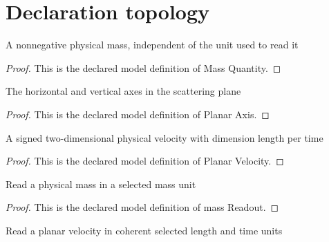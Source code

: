 \section{Declaration topology}
\begin{definition}
  \label{def:physics:phyx-mini-0497:phyxminiproblems-problemphyxmini0497-massquantity}
  A nonnegative physical mass, independent of the unit used to read it
\end{definition}
\begin{proof}
  This is the declared model definition of Mass Quantity.
\end{proof}
\begin{definition}
  \label{def:physics:phyx-mini-0497:phyxminiproblems-problemphyxmini0497-planaraxis}
  The horizontal and vertical axes in the scattering plane
\end{definition}
\begin{proof}
  This is the declared model definition of Planar Axis.
\end{proof}
\begin{definition}
  \label{def:physics:phyx-mini-0497:phyxminiproblems-problemphyxmini0497-planarvelocity}
  A signed two-dimensional physical velocity with dimension length per time
\end{definition}
\begin{proof}
  This is the declared model definition of Planar Velocity.
\end{proof}
\begin{definition}
  \label{def:physics:phyx-mini-0497:phyxminiproblems-problemphyxmini0497-massreadout}
  Read a physical mass in a selected mass unit
\end{definition}
\begin{proof}
  This is the declared model definition of mass Readout.
\end{proof}
\begin{definition}
  \label{def:physics:phyx-mini-0497:phyxminiproblems-problemphyxmini0497-velocityreadout}
  Read a planar velocity in coherent selected length and time units
\end{definition}
